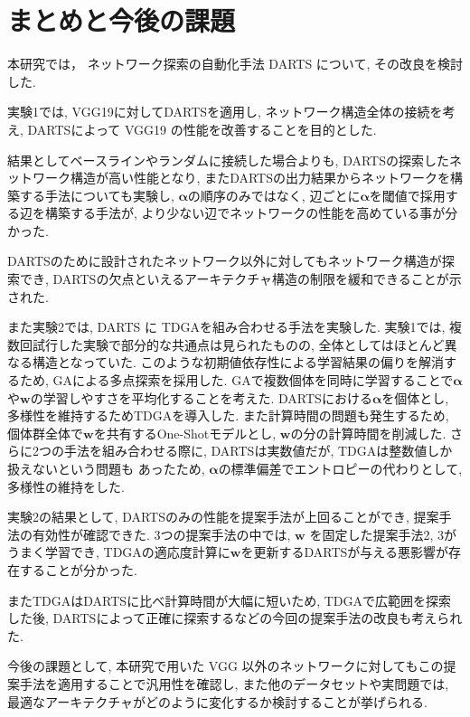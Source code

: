 \newpage
\changeindent{0cm}
\section{まとめと今後の課題}
\label{sec:conclusion}
\changeindent{2cm}

本研究では，
ネットワーク探索の自動化手法 DARTS について, その改良を検討した.

実験1では,
VGG19に対してDARTSを適用し, ネットワーク構造全体の接続を考え,
DARTSによって VGG19 の性能を改善することを目的とした.

結果としてベースラインやランダムに接続した場合よりも,
DARTSの探索したネットワーク構造が高い性能となり,
またDARTSの出力結果からネットワークを構築する手法についても実験し,
$\bm{\alpha}$の順序のみではなく, 辺ごとに$\bm{\alpha}$を閾値で採用する辺を構築する手法が,
より少ない辺でネットワークの性能を高めている事が分かった.

DARTSのために設計されたネットワーク以外に対してもネットワーク構造が探索でき,
DARTSの欠点といえるアーキテクチャ構造の制限を緩和できることが示された.

また実験2では,
DARTS に TDGAを組み合わせる手法を実験した.
実験1では, 複数回試行した実験で部分的な共通点は見られたものの,
全体としてはほとんど異なる構造となっていた.
このような初期値依存性による学習結果の偏りを解消するため,
GAによる多点探索を採用した.
GAで複数個体を同時に学習することで$\bm{\alpha}$や$\bm{w}$の学習しやすさを平均化することを考えた.
DARTSにおける$\bm{\alpha}$を個体とし, 多様性を維持するためTDGAを導入した.
また計算時間の問題も発生するため, 個体群全体で$\bm{w}$を共有するOne-Shotモデルとし,
$\bm{w}$の分の計算時間を削減した.
さらに2つの手法を組み合わせる際に, DARTSは実数値だが, TDGAは整数値しか扱えないという問題も
あったため, $\bm{\alpha}$の標準偏差でエントロピーの代わりとして, 多様性の維持をした.

実験2の結果として, DARTSのみの性能を提案手法が上回ることができ, 提案手法の有効性が確認できた.
3つの提案手法の中では, $\bm{w}$ を固定した提案手法2, 3がうまく学習でき,
TDGAの適応度計算に$\bm{w}$を更新するDARTSが与える悪影響が存在することが分かった.

またTDGAはDARTSに比べ計算時間が大幅に短いため,
TDGAで広範囲を探索した後, DARTSによって正確に探索するなどの今回の提案手法の改良も考えられた.


今後の課題として,
本研究で用いた VGG 以外のネットワークに対してもこの提案手法を適用することで汎用性を確認し,
また他のデータセットや実問題では, 最適なアーキテクチャがどのように変化するか検討することが挙げられる.
